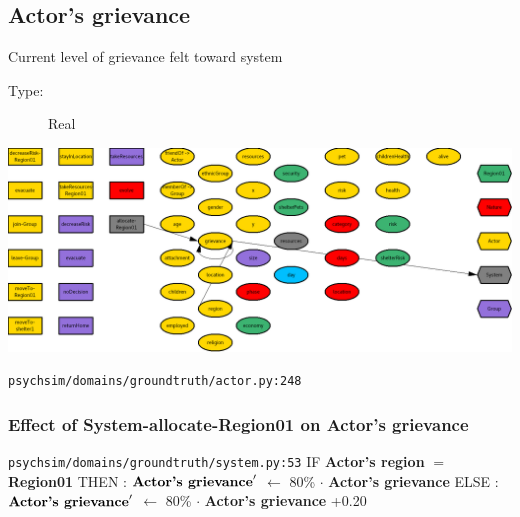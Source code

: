 \documentclass{article}%
\begin{document}
%
\subsection{Actor's grievance}%
\label{subsec:Actor's grievance}%
Current level of grievance felt toward system%
\begin{description}%
\item[Type:]%
Real%
\end{description}%
\includegraphics[width=\textwidth]{images/grievanceOfActor.png}%
\begin{flushleft}%
\verb|psychsim/domains/groundtruth/actor.py:248|%
\end{flushleft}%
\subsubsection{Effect of System{-}allocate{-}Region01 on Actor's grievance}%
\label{ssubsec:Effect of System{-}allocate{-}Region01 on Actor's grievance}%
\begin{flushleft}%
\verb|psychsim/domains/groundtruth/system.py:53|%
\linebreak%
IF %
\textbf{Actor's region}%
$=$%
\textbf{Region01}%
\linebreak%
\hspace*{2em}%
THEN %
: %
$\mbox{\textbf{Actor's grievance}} '$%
$\leftarrow$%
80\%%
$\cdot$%
\textbf{Actor's grievance}%
\linebreak%
\hspace*{2em}%
ELSE %
: %
$\mbox{\textbf{Actor's grievance}} '$%
$\leftarrow$%
80\%%
$\cdot$%
\textbf{Actor's grievance}%
+0.20%
\end{flushleft}

%
\end{document}
